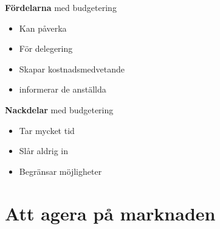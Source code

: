 \textbf{Fördelarna} med budgetering
\begin{itemize}
    \item Kan påverka
    \item För delegering
    \item Skapar kostnadsmedvetande
    \item informerar de anställda
\end{itemize}

\textbf{Nackdelar} med budgetering
\begin{itemize}
    \item Tar mycket tid
    \item Slår aldrig in 
    \item Begränsar möjligheter
\end{itemize}





\section{Att agera på marknaden}
